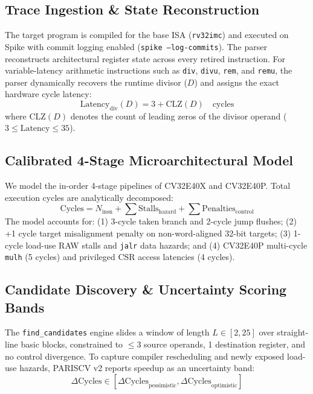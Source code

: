 \documentclass[conference]{IEEEtran}
\begin{document}
\subsection{Trace Ingestion \& State Reconstruction}
The target program is compiled for the base ISA (\texttt{rv32imc}) and executed on Spike with commit logging enabled (\texttt{spike --log-commits}). The parser reconstructs architectural register state across every retired instruction. For variable-latency arithmetic instructions such as \texttt{div}, \texttt{divu}, \texttt{rem}, and \texttt{remu}, the parser dynamically recovers the runtime divisor ($D$) and assigns the exact hardware cycle latency:
\begin{equation}
\text{Latency}_{\text{div}}(D) = 3 + \text{CLZ}(D) \quad \text{cycles}
\end{equation}
where $\text{CLZ}(D)$ denotes the count of leading zeros of the divisor operand ($3 \le \text{Latency} \le 35$).

\subsection{Calibrated 4-Stage Microarchitectural Model}
We model the in-order 4-stage pipelines of CV32E40X and CV32E40P. Total execution cycles are analytically decomposed:
\begin{equation}
\text{Cycles} = N_{\text{insn}} + \sum \text{Stalls}_{\text{hazard}} + \sum \text{Penalties}_{\text{control}}
\label{eq:cycles}
\end{equation}
The model accounts for: (1) 3-cycle taken branch and 2-cycle jump flushes; (2) +1 cycle target misalignment penalty on non-word-aligned 32-bit targets; (3) 1-cycle load-use RAW stalls and \texttt{jalr} data hazards; and (4) CV32E40P multi-cycle \texttt{mulh} (5 cycles) and privileged CSR access latencies (4 cycles).

\subsection{Candidate Discovery \& Uncertainty Scoring Bands}
The \texttt{find\_candidates} engine slides a window of length $L \in [2, 25]$ over straight-line basic blocks, constrained to $\le 3$ source operands, 1 destination register, and no control divergence. To capture compiler rescheduling and newly exposed load-use hazards, PARISCV v2 reports speedup as an uncertainty band:
\begin{equation}
\Delta \text{Cycles} \in [\Delta \text{Cycles}_{\text{pessimistic}}, \Delta \text{Cycles}_{\text{optimistic}}]
\end{equation}
\end{document}
